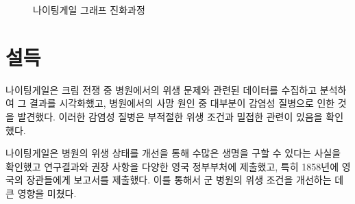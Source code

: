 \documentclass[
  letterpaper,
  chapter,a4paper,showtrims,openright,hidelinks]{oblivoir}
\begin{document}
\begin{figure}
\begin{minipage}[t]{0.20\linewidth}
{{}

}

\end{minipage}%
%
\begin{minipage}[t]{0.20\linewidth}

{\centering 


}

\end{minipage}%

\caption{\label{fig-nightingale}나이팅게일 그래프 진화과정}

\end{figure}

\hypertarget{uxc124uxb4dd}{%
\section{설득}\label{uxc124uxb4dd}}

나이팅게일은 크림 전쟁 중 병원에서의 위생 문제와 관련된 데이터를
수집하고 분석하여 그 결과를 시각화했고, 병원에서의 사망 원인 중 대부분이
감염성 질병으로 인한 것을 발견했다. 이러한 감염성 질병은 부적절한 위생
조건과 밀접한 관련이 있음을 확인했다.

나이팅게일은 병원의 위생 상태를 개선을 통해 수많은 생명을 구할 수 있다는
사실을 확인했고 연구결과와 권장 사항을 다양한 영국 정부부처에 제출했고,
특히 1858년에 영국의 장관들에게 보고서를 제출했다. 이를 통해서 군 병원의
위생 조건을 개선하는 데 큰 영향을 미쳤다.
\end{document}
